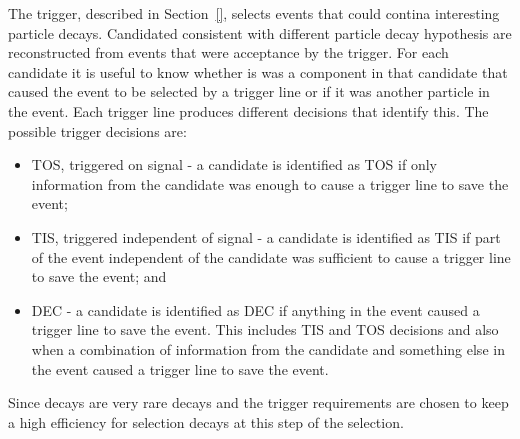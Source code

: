 The trigger, described in Section~\ref{}, selects events that could contina interesting particle decays. Candidated consistent with different particle decay hypothesis are reconstructed from events that were acceptance by the trigger.
For each candidate it is useful to know whether is was a component in that candidate that caused the event to be selected by a trigger line or if it was another particle in the event. 
Each trigger line produces different decisions that identify this. 
The possible trigger decisions are: %
\begin{itemize}
\item TOS, triggered on signal - a candidate is identified as TOS if only information from the candidate was enough to cause a trigger line to save the event;
\item TIS, triggered independent of signal - a candidate is identified as TIS if part of the event independent of the candidate was sufficient to cause a trigger line to save the event; and
\item DEC - a candidate is identified as DEC if anything in the event caused a trigger line to save the event. This includes TIS and TOS decisions and also when a combination of information from the candidate and something else in the event caused a trigger line to save the event.
\end{itemize}
Since \bmumu decays are very rare decays and the trigger requirements are chosen to keep a high efficiency for selection \bmumu decays at this step of the selection. 
